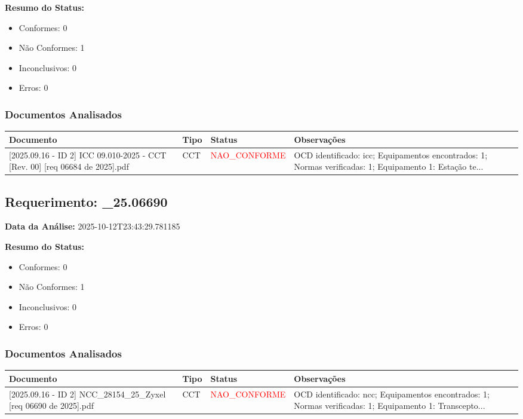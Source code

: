 \documentclass[12pt,a4paper]{article}
\begin{document}
\textbf{Resumo do Status:}
\begin{itemize}
    \item Conformes: 0
    \item Não Conformes: 1
    \item Inconclusivos: 0
    \item Erros: 0
\end{itemize}

\subsubsection{Documentos Analisados}

\begin{longtable}{|p{4cm}|p{2cm}|p{2cm}|p{6cm}|}
\hline
\textbf{Documento} & \textbf{Tipo} & \textbf{Status} & \textbf{Observações} \\
\hline
\endhead
[Certificado de Conformidade Técnica - CCT][2025.09.16 - ID 2] ICC 09.010-2025 - CCT [Rev. 00] [req 06684 de  2025].pdf & CCT & \textcolor{red}{NAO\_CONFORME} & OCD identificado: icc; Equipamentos encontrados: 1; Normas verificadas: 1; Equipamento 1: Estação te... \\
\hline
\end{longtable}


\subsection{Requerimento: \_25.06690}

\textbf{Data da Análise:} 2025-10-12T23:43:29.781185

\textbf{Resumo do Status:}
\begin{itemize}
    \item Conformes: 0
    \item Não Conformes: 1
    \item Inconclusivos: 0
    \item Erros: 0
\end{itemize}

\subsubsection{Documentos Analisados}

\begin{longtable}{|p{4cm}|p{2cm}|p{2cm}|p{6cm}|}
\hline
\textbf{Documento} & \textbf{Tipo} & \textbf{Status} & \textbf{Observações} \\
\hline
\endhead
[Certificado de Conformidade Técnica - CCT][2025.09.16 - ID 2] NCC\_28154\_25\_Zyxel [req 06690 de 2025].pdf & CCT & \textcolor{red}{NAO\_CONFORME} & OCD identificado: ncc; Equipamentos encontrados: 1; Normas verificadas: 1; Equipamento 1: Transcepto... \\
\hline
\end{longtable}
\end{document}
